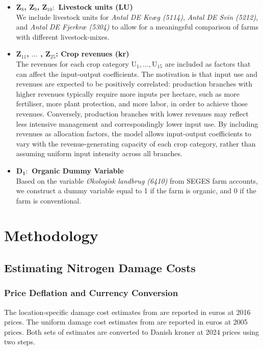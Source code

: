 \documentclass[12pt]{article}
\begin{document}
\begin{itemize}
    \item[] \textbf{Z$_8$, Z$_9$, Z$_{10}:$ Livestock units (LU)} \\[0.25cm]
    We include livestock units for \textit{Antal DE Kvæg (5114)}, \textit{Antal DE Svin (5212)}, and \textit{Antal DE Fjerkræ (5304)} to allow for a meaningsful comparison of farms with different livestock-mixes.
    \item[] \textbf{Z$_{11}$, $\ldots$ , Z$_{25}$: Crop revenues (kr)}\\[0.25cm]
    The revenues for each crop category $\text{U}_1, \ldots, \text{U}_{15}$ are included as factors that can affect the input-output coefficients. The motivation is that input use and revenues are expected to be positively correlated: production branches with higher revenues typically require more inputs per hectare, such as more fertiliser, more plant protection, and more labor, in order to achieve those revenues. Conversely, production branches with lower revenues may reflect less intensive management and correspondingly lower input use. 
    By including revenues as allocation factors, the model allows input-output coefficients to vary  with the revenue-generating capacity of each crop category, rather than assuming uniform input intensity across all branches.
    \item[] \textbf{D$_\textbf{1}:$ Organic Dummy Variable} \\[0.25cm]
    Based on the variable \textit{Økologisk landbrug (6410)} from SEGES farm accounts, we construct a dummy variable equal to 1 if the farm is organic, and 0 if the farm is conventional.
\end{itemize}


\newpage


\section{Methodology}

\subsection{Estimating Nitrogen Damage Costs}

\subsubsection{Price Deflation and Currency Conversion}
\label{app:price-deflation}

The location-specific damage cost estimates from \citet{andersen2019} are 
reported in euros at 2016 prices. The uniform damage cost estimates from 
\citet{brink2011} are reported in euros at 2005 prices. Both sets of 
estimates are converted to Danish kroner at 2024 prices using two steps.
\end{document}
